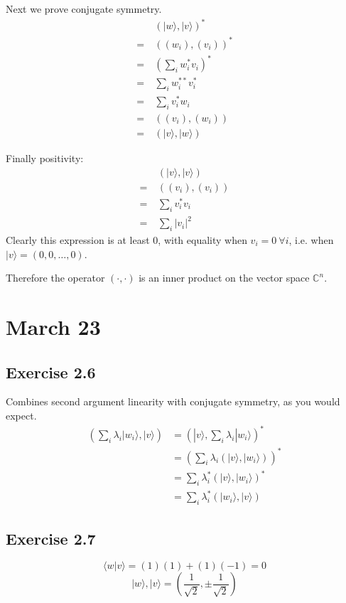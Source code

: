\documentclass[]{article}
\begin{document}
Next we prove conjugate symmetry.
\begin{align*}
&(|w\rangle, |v\rangle)^* \\
=\ &((w_i), (v_i))^* \\
=\ &\left(\sum_iw_i^*v_i\right)^* \\
=\ &\sum_iw_i^{**}v_i^* \\
=\ &\sum_iv_i^*w_i \\
=\ &((v_i), (w_i)) \\
=\ &(|v\rangle, |w\rangle)
\end{align*}

Finally positivity:
\begin{align*}
&(|v\rangle, |v\rangle) \\
=\ &((v_i), (v_i)) \\
=\ &\sum_iv_i^*v_i \\
=\ &\sum_i|v_i|^2
\end{align*}
Clearly this expression is at least 0, with equality when $v_i = 0\ \forall i$, i.e. when $|v\rangle = (0, 0, \ldots, 0)$.

Therefore the operator $(\cdot, \cdot)$ is an inner product on the vector space $\mathbb{C}^n$.

\section{March 23}

\subsection{Exercise 2.6}

Combines second argument linearity with conjugate symmetry, as you would expect.
\begin{align*}
\left(\sum_i\lambda_i|w_i\rangle, |v\rangle\right)
&= 
\left(|v\rangle, \sum_i\lambda_i|w_i\rangle\right)^* \\
&= \left(\sum_i\lambda_i\left(|v\rangle, |w_i\rangle\right)\right)^* \\
&= \sum_i\lambda_i^*\left(|v\rangle, |w_i\rangle\right)^* \\
&= \sum_i\lambda_i^*\left(|w_i\rangle, |v\rangle\right)
\end{align*}

\subsection{Exercise 2.7}

\[\langle w|v\rangle = (1)(1)+(1)(-1) = 0\]
\[|w\rangle, |v\rangle = \left(\frac{1}{\sqrt{2}}, \pm\frac{1}{\sqrt{2}}\right)\]
\end{document}
